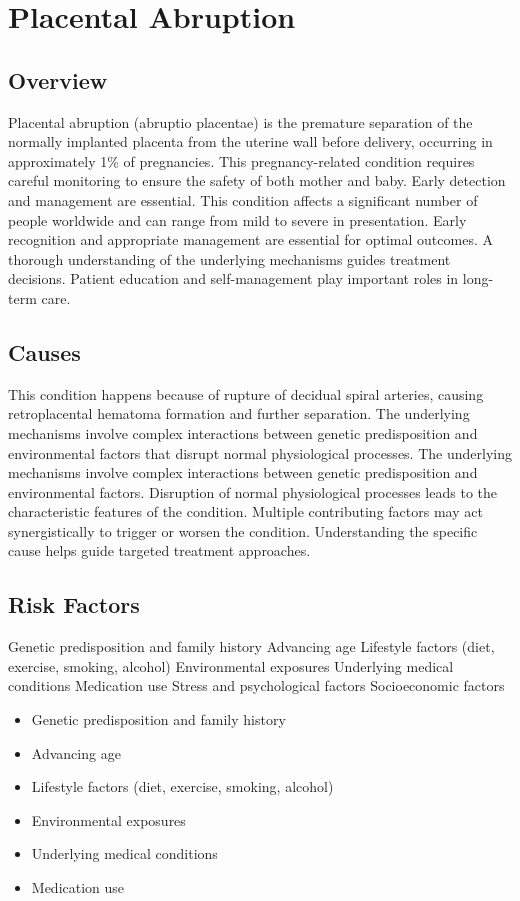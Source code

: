 \chapter{Placental Abruption}
\label{sec:Placental Abruption}

\section{Overview}
Placental abruption (abruptio placentae) is the premature separation of the normally implanted placenta from the uterine wall before delivery, occurring in approximately 1\% of pregnancies. This pregnancy-related condition requires careful monitoring to ensure the safety of both mother and baby. Early detection and management are essential. This condition affects a significant number of people worldwide and can range from mild to severe in presentation. Early recognition and appropriate management are essential for optimal outcomes. A thorough understanding of the underlying mechanisms guides treatment decisions. Patient education and self-management play important roles in long-term care.
\section{Causes}
This condition happens because of rupture of decidual spiral arteries, causing retroplacental hematoma formation and further separation. The underlying mechanisms involve complex interactions between genetic predisposition and environmental factors that disrupt normal physiological processes. The underlying mechanisms involve complex interactions between genetic predisposition and environmental factors. Disruption of normal physiological processes leads to the characteristic features of the condition. Multiple contributing factors may act synergistically to trigger or worsen the condition. Understanding the specific cause helps guide targeted treatment approaches.
\section{Risk Factors}
Genetic predisposition and family history Advancing age Lifestyle factors (diet, exercise, smoking, alcohol) Environmental exposures Underlying medical conditions Medication use Stress and psychological factors Socioeconomic factors

\begin{itemize}[noitemsep]
  \item Genetic predisposition and family history
  \item Advancing age
  \item Lifestyle factors (diet, exercise, smoking, alcohol)
  \item Environmental exposures
  \item Underlying medical conditions
  \item Medication use
\end{itemize}
